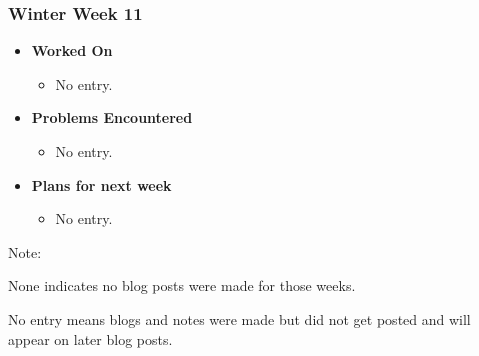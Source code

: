 \documentclass[compsoc,draftclsnofoot,onecolumn,10pt]{IEEEtran}
\begin{document}
\subsubsection{Winter Week 11}
\begin{itemize}
    \item {\textbf{Worked On}}
    \begin{itemize}
      \item No entry.
    \end{itemize}

    \item {\textbf{Problems Encountered}}
    \begin{itemize}
      \item No entry.
    \end{itemize}

    \item{\textbf{Plans for next week}}
    \begin{itemize}
      \item No entry.
    \end{itemize}

\end{itemize}

Note:\par
None indicates no blog posts were made for those weeks.\par
No entry means blogs and notes were made but did not get posted and will
appear on later blog posts.
\end{document}

